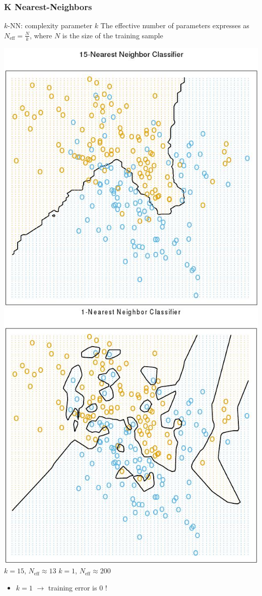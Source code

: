 \documentclass[compress, smaller, serif, 9pt]{beamer}
\begin{document}
\begin{frame}
  \frametitle{K Nearest-Neighbors}
\begin{block}{$k$-NN: complexity parameter $k$}
      The effective number of parameters expresses as $N_{\textrm{eff}} = \frac{N}{k}$,
      where $N$ is the size of the training sample
  \end{block}

  \begin{center}
    \includegraphics[width=.45\textwidth]{ex_kpp_15.jpg}
  \quad
    \includegraphics[width=.45\textwidth]{ex_kpp_1.jpg}\\
    $k=15$, $N_{\textrm{eff}} \approx 13$ \hspace{3cm} $k=1$, $N_{\textrm{eff}} \approx 200$
  \end{center}
  \begin{itemize}
     \item $k=1$ $\rightarrow$ training error is $0$ !
  \end{itemize}

\end{frame}
\end{document}
